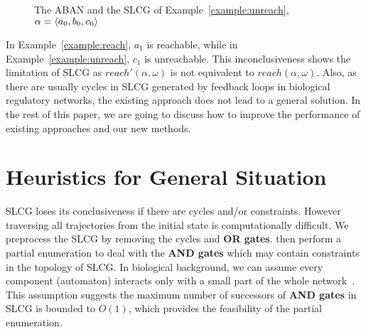 \documentclass{article}
\theoremstyle{definition}
\DeclarePairedDelimiter{\init}{\langle}{\rangle}
\begin{document}
\begin{figure}[ht]
\centering

\caption{The ABAN and the SLCG of Example~\ref{example:unreach}, $\alpha=\init{ a_0,b_0,c_0}$}
\label{fig:3}
\end{figure}
In Example~\ref{example:reach}, $a_1$ is reachable, while in Example~\ref{example:unreach}, $c_1$ is unreachable. This inconclusiveness shows the limitation of SLCG as $reach'(\alpha,\omega)$ is not equivalent to $reach(\alpha,\omega)$.
Also, as there are usually cycles in SLCG generated by feedback loops in biological regulatory networks, the existing approach does not lead to a general solution.
In the rest of this paper, we are going to discuss how to improve the performance of existing approaches and our new methods. 

\section{Heuristics for General Situation}\label{sect:4}
SLCG loses its conclusiveness if there are cycles and/or constraints.
However traversing all trajectories from the initial state is computationally difficult. 
We preprocess the SLCG by removing the cycles and \textbf{OR gates}.
then perform a partial enumeration to deal with the \textbf{AND gates} which may contain constraints in the topology of SLCG.
In biological background, we can assume every component (automaton) interacts only with a small part of the whole network~\cite{akutsu2007control}.
This assumption suggests the maximum number of successors of \textbf{AND gates} in SLCG is bounded to $O(1)$, which provides the feasibility of the partial enumeration.
\end{document}
